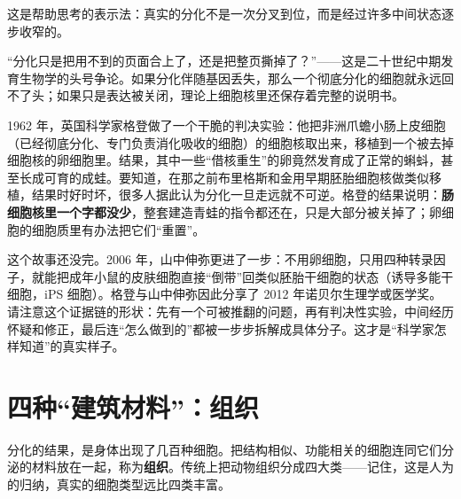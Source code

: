\begin{center}
\end{center}

这是帮助思考的表示法：真实的分化不是一次分叉到位，而是经过许多中间状态逐步收窄的。

\begin{zhengju}
“分化只是把用不到的页面合上了，还是把整页撕掉了？”——这是二十世纪中期发育生物学的头号争论。如果分化伴随基因丢失，那么一个彻底分化的细胞就永远回不了头；如果只是表达被关闭，理论上细胞核里还保存着完整的说明书。

1962 年，英国科学家格登做了一个干脆的判决实验：他把非洲爪蟾小肠上皮细胞（已经彻底分化、专门负责消化吸收的细胞）的细胞核取出来，移植到一个被去掉细胞核的卵细胞里。结果，其中一些“借核重生”的卵竟然发育成了正常的蝌蚪，甚至长成可育的成蛙。要知道，在那之前布里格斯和金用早期胚胎细胞核做类似移植，结果时好时坏，很多人据此认为分化一旦走远就不可逆。格登的结果说明：\textbf{肠细胞核里一个字都没少}，整套建造青蛙的指令都还在，只是大部分被关掉了；卵细胞的细胞质里有办法把它们“重置”。

这个故事还没完。2006 年，山中伸弥更进了一步：不用卵细胞，只用四种转录因子，就能把成年小鼠的皮肤细胞直接“倒带”回类似胚胎干细胞的状态（诱导多能干细胞，iPS 细胞）。格登与山中伸弥因此分享了 2012 年诺贝尔生理学或医学奖。请注意这个证据链的形状：先有一个可被推翻的问题，再有判决性实验，中间经历怀疑和修正，最后连“怎么做到的”都被一步步拆解成具体分子。这才是“科学家怎样知道”的真实样子。
\end{zhengju}

\section{四种“建筑材料”：组织}

分化的结果，是身体出现了几百种细胞。把结构相似、功能相关的细胞连同它们分泌的材料放在一起，称为\textbf{组织}。传统上把动物组织分成四大类——记住，这是人为的归纳，真实的细胞类型远比四类丰富。


